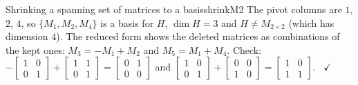 \documentclass[11pt]{article}
\begin{document}
\begin{exmp}{Shrinking a spanning set of matrices to a basis}{shrinkM2}
The pivot columns are $1$, $2$, $4$, so $\{M_1,M_2,M_4\}$ is a basis for $H$, $\dim H=3$ and $H\ne M_{2\times2}$ (which has dimension $4$). The reduced form shows the deleted matrices as combinations of the kept ones: $M_3=-M_1+M_2$ and $M_5=M_1+M_4$. Check: $-\begin{bmatrix}1&0\\0&1\end{bmatrix}+\begin{bmatrix}1&1\\0&1\end{bmatrix}=\begin{bmatrix}0&1\\0&0\end{bmatrix}$ and $\begin{bmatrix}1&0\\0&1\end{bmatrix}+\begin{bmatrix}0&0\\1&0\end{bmatrix}=\begin{bmatrix}1&0\\1&1\end{bmatrix}$. \ $\checkmark$
\end{exmp}
\end{document}
